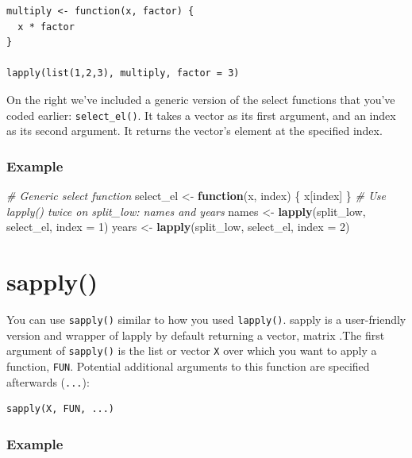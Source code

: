 \documentclass[
]{book}
\newenvironment{Shaded}{\begin{snugshade}}{\end{snugshade}}
\newcommand{\CommentTok}[1]{\textcolor[rgb]{0.56,0.35,0.01}{\textit{#1}}}
\newcommand{\ControlFlowTok}[1]{\textcolor[rgb]{0.13,0.29,0.53}{\textbf{#1}}}
\newcommand{\DataTypeTok}[1]{\textcolor[rgb]{0.13,0.29,0.53}{#1}}
\newcommand{\DecValTok}[1]{\textcolor[rgb]{0.00,0.00,0.81}{#1}}
\newcommand{\KeywordTok}[1]{\textcolor[rgb]{0.13,0.29,0.53}{\textbf{#1}}}
\newcommand{\NormalTok}[1]{#1}
\newcommand{\StringTok}[1]{\textcolor[rgb]{0.31,0.60,0.02}{#1}}
\begin{document}
\begin{verbatim}
multiply <- function(x, factor) {
  x * factor
}

lapply(list(1,2,3), multiply, factor = 3)
\end{verbatim}

On the right we've included a generic version of the select functions that you've coded earlier: \texttt{select\_el()}. It takes a vector as its first argument, and an index as its second argument. It returns the vector's element at the specified index.

\hypertarget{example-3}{%
\subsubsection{Example}\label{example-3}}

\begin{Shaded}
\begin{Highlighting}[]
\CommentTok{# Generic select function}
\NormalTok{select_el <-}\StringTok{ }\ControlFlowTok{function}\NormalTok{(x, index) \{}
\NormalTok{  x[index]}
\NormalTok{\}}
\CommentTok{# Use lapply() twice on split_low: names and years}
\NormalTok{names <-}\StringTok{ }\KeywordTok{lapply}\NormalTok{(split_low, select_el, }\DataTypeTok{index =} \DecValTok{1}\NormalTok{)}
\NormalTok{years <-}\StringTok{ }\KeywordTok{lapply}\NormalTok{(split_low, select_el, }\DataTypeTok{index =} \DecValTok{2}\NormalTok{)}
\end{Highlighting}
\end{Shaded}

\hypertarget{sapply}{%
\section{sapply()}\label{sapply}}

You can use \texttt{sapply()} similar to how you used \texttt{lapply()}. sapply is a user-friendly version and wrapper of lapply by default returning a vector, matrix .The first argument of \texttt{sapply()} is the list or vector \texttt{X} over which you want to apply a function, \texttt{FUN}. Potential additional arguments to this function are specified afterwards (\texttt{...}):

\begin{verbatim}
sapply(X, FUN, ...)
\end{verbatim}

\hypertarget{example-4}{%
\subsubsection{Example}\label{example-4}}
\end{document}

